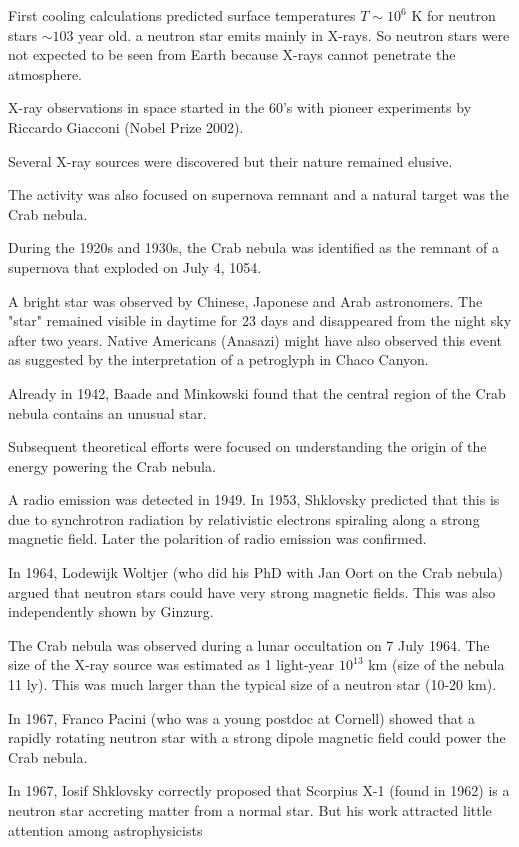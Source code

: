 First cooling calculations predicted surface temperatures $T \sim 10^6$ K for neutron stars $\sim 103$ year old.\cite{CS64}
a neutron star emits mainly in X-rays. 
So neutron stars were not expected to be seen from Earth because X-rays cannot penetrate the atmosphere.


X-ray observations in space started in the 60’s with pioneer experiments by Riccardo Giacconi (Nobel Prize 2002).

Several X-ray sources were discovered but their nature remained elusive.

The activity was also focused on supernova remnant and a natural target was the Crab nebula.

During the 1920s and 1930s, the Crab nebula was identified as the remnant of a supernova that exploded on July 4, 1054.

A bright star was observed by Chinese, Japonese and Arab astronomers. 
The "star" remained visible in daytime for 23 days and disappeared from the night sky after two years.
Native Americans (Anasazi) might have also observed this event as suggested by the interpretation of a petroglyph in Chaco Canyon.

Already in 1942, Baade and Minkowski found that the central region of the Crab nebula contains an unusual star.

Subsequent theoretical efforts were focused on understanding the origin of the energy powering the Crab nebula.

A radio emission was detected in 1949. 
In 1953, Shklovsky predicted that this is due to synchrotron radiation by relativistic electrons spiraling along a strong magnetic field. 
Later the polarition of radio emission was confirmed. 

In 1964, Lodewijk Woltjer (who did his PhD with Jan Oort on the Crab nebula) argued that neutron stars could have very strong magnetic fields. \cite{Woltjer64}
This was also independently shown by Ginzurg. \cite{Ginzburg64}


The Crab nebula was observed during a lunar occultation on 7 July 1964. 
The size of the X-ray source was estimated as 1 light-year $10^{13}$ km (size of the nebula 11 ly). 
This was much larger than the typical size of a neutron star (10-20 km).

In 1967, Franco Pacini (who was a young postdoc at Cornell) showed that a rapidly rotating neutron star with a strong dipole magnetic field could power the Crab nebula.

In 1967, Iosif Shklovsky correctly proposed that Scorpius X-1 (found in 1962) is a neutron star accreting matter from a normal star. \cite{Shklovsky67}
But his work attracted little attention among astrophysicists

